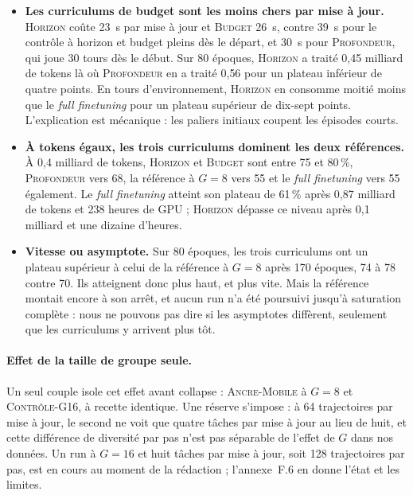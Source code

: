 \documentclass[11pt,a4paper]{article}
\begin{document}
\begin{itemize}
    \item \textbf{Les curriculums de budget sont les moins chers par mise à jour.} \textsc{Horizon} coûte 23~s par mise à jour et \textsc{Budget} 26~s, contre 39~s pour le contrôle à horizon et budget pleins dès le départ, et 30~s pour \textsc{Profondeur}, qui joue 30 tours dès le début. Sur 80 époques, \textsc{Horizon} a traité 0{,}45 milliard de tokens là où \textsc{Profondeur} en a traité 0{,}56 pour un plateau inférieur de quatre points. En tours d'environnement, \textsc{Horizon} en consomme moitié moins que le \emph{full finetuning} pour un plateau supérieur de dix-sept points. L'explication est mécanique : les paliers initiaux coupent les épisodes courts.
    \item \textbf{À tokens égaux, les trois curriculums dominent les deux références.} À 0{,}4 milliard de tokens, \textsc{Horizon} et \textsc{Budget} sont entre 75 et 80\,\%, \textsc{Profondeur} vers 68, la référence à $G=8$ vers 55 et le \emph{full finetuning} vers 55 également. Le \emph{full finetuning} atteint son plateau de 61\,\% après 0{,}87 milliard de tokens et 238 heures de GPU ; \textsc{Horizon} dépasse ce niveau après 0{,}1 milliard et une dizaine d'heures.
    \item \textbf{Vitesse ou asymptote.} Sur 80 époques, les trois curriculums ont un plateau supérieur à celui de la référence à $G=8$ après 170 époques, 74 à 78 contre 70. Ils atteignent donc plus haut, et plus vite. Mais la référence montait encore à son arrêt, et aucun run n'a été poursuivi jusqu'à saturation complète : nous ne pouvons pas dire si les asymptotes diffèrent, seulement que les curriculums y arrivent plus tôt.
\end{itemize}

\paragraph{Effet de la taille de groupe seule.} Un seul couple isole cet effet avant collapse : \textsc{Ancre-Mobile} à $G=8$ et \textsc{Contrôle-G16}, à recette identique. Une réserve s'impose : à 64 trajectoires par mise à jour, le second ne voit que quatre tâches par mise à jour au lieu de huit, et cette différence de diversité par pas n'est pas séparable de l'effet de $G$ dans nos données. Un run à $G=16$ et huit tâches par mise à jour, soit 128 trajectoires par pas, est en cours au moment de la rédaction ; l'annexe~F.6 en donne l'état et les limites.
\end{document}
